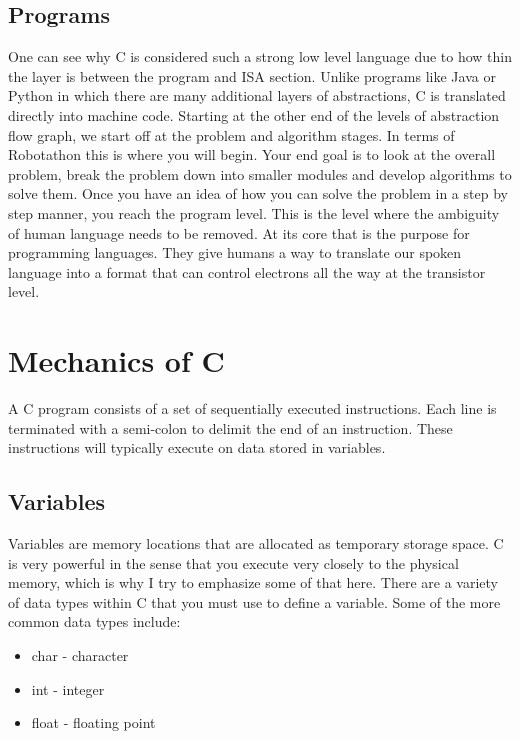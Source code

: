 \documentclass[paper=a4, fontsize=11pt]{scrartcl}
\numberwithin{equation}{section}		%
\numberwithin{figure}{section}			%
\numberwithin{table}{section}			%
\begin{document}
\subsection{Programs}
One can see why C is considered such a strong low level language due to how thin the layer is between the program and ISA section. Unlike programs like Java or Python in which there are many additional layers of abstractions, C is translated directly into machine code. Starting at the other end of the levels of abstraction flow graph, we start off at the problem and algorithm stages. In terms of Robotathon this is where you will begin. Your end goal is to look at the overall problem, break the problem down into smaller modules and develop algorithms to solve them. Once you have an idea of how you can solve the problem in a step by step manner, you reach the program level. This is the level where the ambiguity of human language needs to be removed. At its core that is the purpose for programming languages. They give humans a way to translate our spoken language into a format that can control electrons all the way at the transistor level.

\section{Mechanics of C}
A C program consists of a set of sequentially executed instructions. Each line is terminated with a semi-colon to delimit the end of an instruction. These instructions will typically execute on data stored in variables. 

\subsection{Variables}
Variables are memory locations that are allocated as temporary storage space. C is very powerful in the sense that you execute very closely to the physical memory, which is why I try to emphasize some of that here. There are a variety of data types within C that you must use to define a variable. Some of the more common data types include:
\begin{itemize}
	\item char - character
	\item int - integer
	\item float - floating point
\end{itemize}
\end{document}

